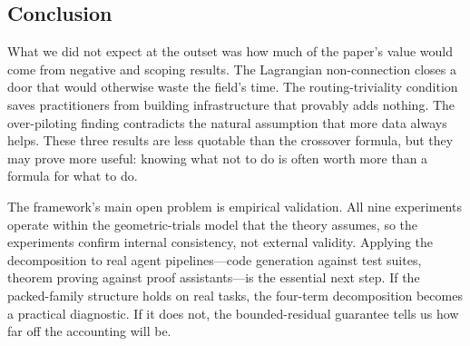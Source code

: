 \subsection{Conclusion}

What we did not expect at the outset was how much of the paper's value would come from negative and scoping results.
The Lagrangian non-connection closes a door that would otherwise waste the field's time.
The routing-triviality condition saves practitioners from building infrastructure that provably adds nothing.
The over-piloting finding contradicts the natural assumption that more data always helps.
These three results are less quotable than the crossover formula, but they may prove more useful: knowing what not to do is often worth more than a formula for what to do.

The framework's main open problem is empirical validation.
All nine experiments operate within the geometric-trials model that the theory assumes, so the experiments confirm internal consistency, not external validity.
Applying the decomposition to real agent pipelines---code generation against test suites, theorem proving against proof assistants---is the essential next step.
If the packed-family structure holds on real tasks, the four-term decomposition becomes a practical diagnostic.
If it does not, the bounded-residual guarantee tells us how far off the accounting will be.

